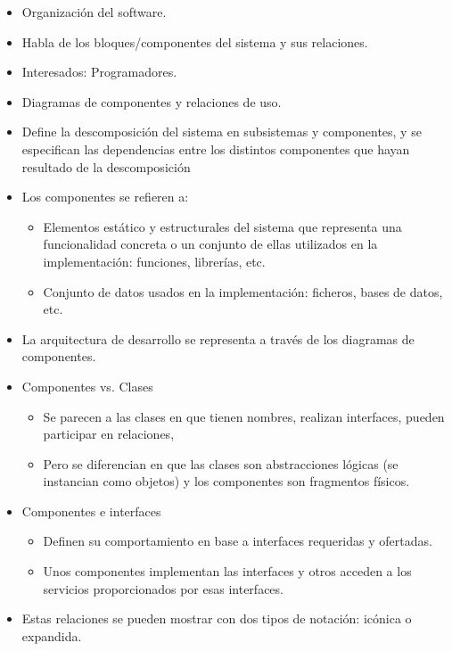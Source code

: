 \documentclass[12pt, twoside, openright]{report} %
\begin{document}
\begin{itemize}
\begin{itemize}
			\item
				Organización del software.
			\item
				Habla de los bloques/componentes del sistema y sus relaciones.
			\item
				Interesados: Programadores.
			\item
				Diagramas de componentes y relaciones de uso.
			\item
				Define la descomposición del sistema en subsistemas y
				componentes, y se especifican las dependencias entre los
				distintos componentes que hayan resultado de la descomposición
			\pagebreak
			\item
				Los componentes se refieren a:
				\begin{itemize}
					\item
					Elementos estático y estructurales del sistema que representa
					una funcionalidad concreta o un conjunto de ellas utilizados
					en la implementación: funciones, librerías, etc.
					\item
					Conjunto de datos usados en la implementación: ficheros, bases
					de datos, etc.
				\end{itemize}
			\item
				La arquitectura de desarrollo se representa a través de los
				diagramas de componentes.
			\item
				Componentes vs. Clases
				\begin{itemize}
					\item
					Se parecen a las clases en que tienen nombres, realizan
					interfaces, pueden participar en relaciones,
					\item
					Pero se diferencian en que las clases son abstracciones
					lógicas (se instancian como objetos) y los componentes son
					fragmentos físicos.
				\end{itemize}
			\item
				Componentes e interfaces
				\begin{itemize}
					\item
					Definen su comportamiento en base a interfaces requeridas y
					ofertadas.
					\item
					Unos componentes implementan las interfaces y otros acceden a
					los servicios proporcionados por esas interfaces.
				\end{itemize}
			\item
				Estas relaciones se pueden mostrar con dos tipos de notación:
				icónica o expandida.
				\begin{figure}[H]

\end{figure}
\end{itemize}
\end{itemize}
\end{document}
